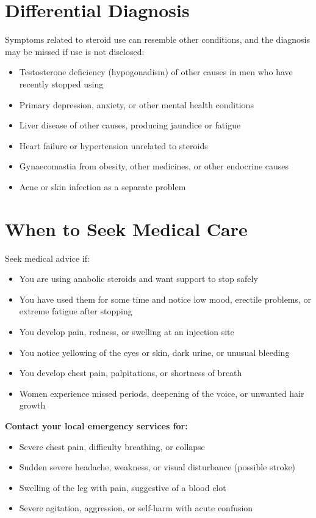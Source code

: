 \section*{Differential Diagnosis}
Symptoms related to steroid use can resemble other conditions, and the diagnosis may be missed if use is not disclosed:
\begin{itemize}
    \item Testosterone deficiency (hypogonadism) of other causes in men who have recently stopped using
    \item Primary depression, anxiety, or other mental health conditions
    \item Liver disease of other causes, producing jaundice or fatigue
    \item Heart failure or hypertension unrelated to steroids
    \item Gynaecomastia from obesity, other medicines, or other endocrine causes
    \item Acne or skin infection as a separate problem
\end{itemize}

\section*{When to Seek Medical Care}
Seek medical advice if:
\begin{itemize}
    \item You are using anabolic steroids and want support to stop safely
    \item You have used them for some time and notice low mood, erectile problems, or extreme fatigue after stopping
    \item You develop pain, redness, or swelling at an injection site
    \item You notice yellowing of the eyes or skin, dark urine, or unusual bleeding
    \item You develop chest pain, palpitations, or shortness of breath
    \item Women experience missed periods, deepening of the voice, or unwanted hair growth
\end{itemize}

\textbf{Contact your local emergency services for:}
\begin{itemize}
    \item Severe chest pain, difficulty breathing, or collapse
    \item Sudden severe headache, weakness, or visual disturbance (possible stroke)
    \item Swelling of the leg with pain, suggestive of a blood clot
    \item Severe agitation, aggression, or self-harm with acute confusion
\end{itemize}

